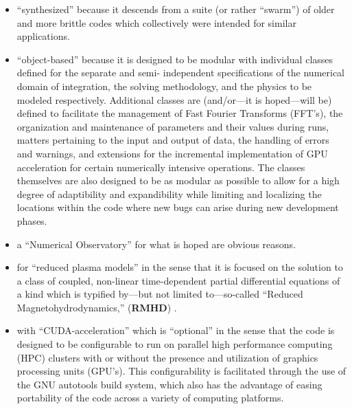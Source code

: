 \documentclass[12pt, letterpaper, oneside, leqno, openright]{memoir}
\newcommand{\hrmhd}{\textbf{RMHD}}
\begin{document}
\begin{itemize}
%
\item{``synthesized'' because it descends from a suite (or rather
      ``swarm'') of older and more brittle codes which collectively
       were intended for similar applications.
     }
%
\item{ ``object-based'' because it is designed to be modular with
       individual classes defined for the separate and semi-
       independent specifications of the numerical domain of
       integration, the solving methodology, and the physics to be
       modeled respectively. Additional classes are (and/or---it is
       hoped---will be) defined to facilitate the management of
       Fast Fourier Transforms (FFT's), the organization and
       maintenance of parameters and their values during runs,
       matters pertaining to the input and output of data, the
       handling of errors and warnings, and extensions for the
       incremental implementation of GPU acceleration for certain
       numerically intensive operations. The classes themselves
       are also designed to be as modular as possible to allow for
       a high degree of adaptibility and expandibility while
       limiting and localizing the locations within the code where
       new bugs can arise during new development phases.
     }
%
\item{ a ``Numerical Observatory'' for what is hoped are obvious
       reasons.
     }
%
%
\item{ for ``reduced plasma models'' in the sense that it is
       focused on the solution to a class of coupled, non-linear
       time-dependent partial differential equations of a kind
       which is typified by---but not limited to---so-called
       ``Reduced Magnetohydrodynamics,'' (\hrmhd)
       \citep{KadomtsevPogutse74, Strauss76, Strauss77}.
     }
%
\item{ with ``CUDA-acceleration'' which is ``optional'' in the
       sense that the code is designed to be configurable to run
       on parallel high performance computing (HPC) clusters with
       or without the presence and utilization of graphics
       processing units (GPU's). This configurability is
       facilitated through the use of the GNU autotools build
       system, which also has the advantage of easing portability
       of the code across a variety of computing platforms.
     }
%
\end{itemize}
%
\par
\end{document}
